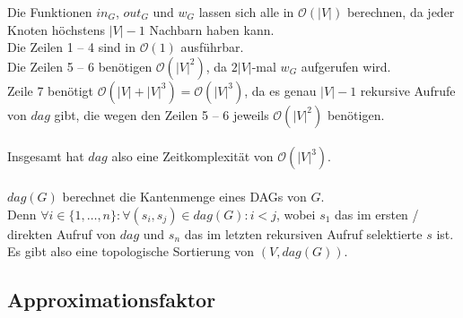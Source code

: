 Die Funktionen $in_G$, $out_G$ und $w_G$ lassen sich alle in $\mathcal{O}(|V|)$ berechnen, da jeder Knoten höchstens $|V| - 1$ Nachbarn haben kann. \\
Die Zeilen 1 – 4 sind in $\mathcal{O}(1)$ ausführbar. \\
Die Zeilen 5 – 6 benötigen $\mathcal{O}(|V|^2)$, da $2 |V|$-mal $w_G$ aufgerufen wird. \\
Zeile 7 benötigt $\mathcal{O}(|V| + |V|^3) = \mathcal{O}(|V|^3)$, da es genau $|V| - 1$ rekursive Aufrufe von $dag$ gibt, die wegen den Zeilen 5 – 6 jeweils $\mathcal{O}(|V|^2)$ benötigen.
\\ \\
Insgesamt hat $dag$ also eine Zeitkomplexität von $\mathcal{O}(|V|^3)$.
\\ \\
$dag(G)$ berechnet die Kantenmenge eines DAGs von $G$. \\
Denn $\forall i \in \{ 1, \dots, n \}: \forall (s_i, s_j) \in dag(G): i < j$, wobei $s_1$ das im ersten / direkten Aufruf von $dag$ und $s_n$ das im letzten rekursiven Aufruf selektierte $s$ ist. Es gibt also eine topologische Sortierung von $(V, dag(G))$.

\subsection{Approximationsfaktor}
\label{sub:Approximationsfaktor}

